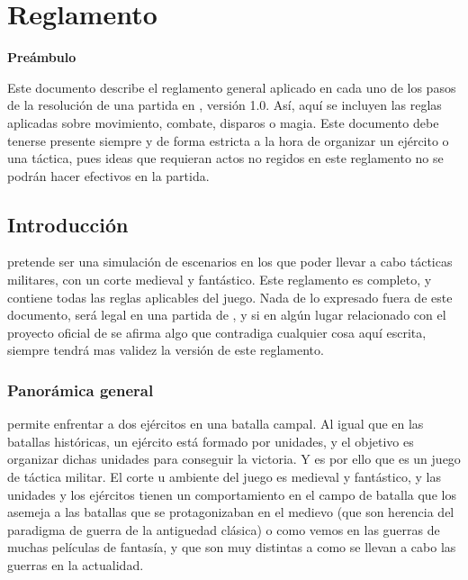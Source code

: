 %


\chapter{Reglamento}
\label{reglamento}

\begin{center}
{\bf\large Preámbulo}

\begin{minipage}{12cm}
{\small
Este documento describe el reglamento general aplicado en cada uno de
los pasos de la resolución de una partida en \gom, versión 1.0. Así,
aquí se incluyen las reglas aplicadas sobre movimiento, combate, disparos
o magia. Este documento debe tenerse presente siempre y de forma estricta a la hora de organizar un ejército o una táctica, pues ideas que requieran actos no regidos en este reglamento no se podrán hacer efectivos en la partida.}
\end{minipage}
\end{center}

\section*{Introducción}
\label{introduccion}
\gom pretende ser una simulación de escenarios en los que poder llevar
a cabo tácticas militares, con un corte medieval y fantástico. Este reglamento es completo, y contiene
todas las reglas aplicables del juego. Nada de lo expresado fuera de
este documento, será legal en una partida de \gomf, y si en algún lugar relacionado con el proyecto oficial de \gom se afirma algo que contradiga cualquier cosa aquí escrita, siempre tendrá mas validez la versión de este reglamento.

\subsection*{Panorámica general}
\gom permite enfrentar a dos ejércitos en una batalla campal. Al igual
que en las batallas históricas, un ejército está formado por unidades,
y el objetivo es organizar dichas unidades para conseguir la
victoria. Y es por ello que \gom es un juego de táctica militar. El
corte u ambiente del juego es medieval y fantástico, y las unidades y
los ejércitos tienen un comportamiento en el campo de batalla que los
asemeja a las batallas que se protagonizaban en el medievo (que son
herencia del paradigma de guerra de la antiguedad clásica) o como vemos en las guerras de muchas películas de
fantasía, y que son muy distintas a como se llevan a cabo las guerras
en la actualidad.

